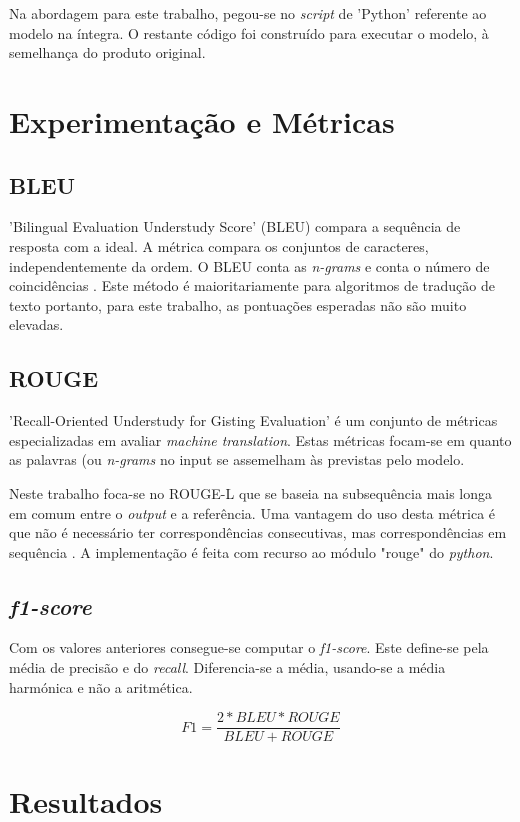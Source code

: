 \documentclass{article}
\begin{document}
Na abordagem para este trabalho, pegou-se no \textit{script} de 'Python' referente ao modelo na íntegra. O restante código foi construído para executar o modelo, à semelhança do produto original.

\section{Experimentação e Métricas}
\label{metricas}
\subsection{BLEU}
'Bilingual Evaluation Understudy Score' (BLEU) compara a sequência de resposta com a ideal. A métrica compara os conjuntos de caracteres, independentemente da ordem. O BLEU conta as \textit{n-grams} e conta o número de coincidências \cite{papineni2002bleu}. Este método é maioritariamente para algoritmos de tradução de texto portanto, para este trabalho, as pontuações esperadas não são muito elevadas. 

\subsection{ROUGE}
'Recall-Oriented Understudy for Gisting Evaluation' é um conjunto de métricas especializadas em avaliar \textit{machine translation}. Estas métricas focam-se em quanto as palavras (ou \textit{n-grams} no input se assemelham às previstas pelo modelo.

Neste trabalho foca-se no ROUGE-L que se baseia na subsequência mais longa em comum entre o \textit{output} e a referência. Uma vantagem do uso desta métrica é que não é necessário ter correspondências consecutivas, mas correspondências em sequência \cite{rouge}. A implementação é feita com recurso ao módulo "rouge" do \textit{python}.

\subsection{\textit{f1-score}}
Com os valores anteriores consegue-se computar o \textit{f1-score}. Este define-se pela média de precisão e do \textit{recall}. Diferencia-se a média, usando-se a média harmónica e não a aritmética.

\begin{equation}
F1 = \frac{2*BLEU*ROUGE}{BLEU+ROUGE}
\end{equation}


\section{Resultados}
\end{document}
